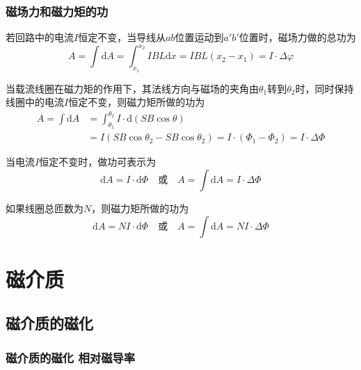\documentclass[
	12pt, %
	a4paper, %
]{myLegrandOrangeBook}
\newcommand{\rmd}{\mathrm{d}}
\begin{document}
\subsection{磁场力和磁力矩的功}

若回路中的电流\(I\)恒定不变，当导线从\(ab\)位置运动到\(a\prime b \prime\)位置时，磁场力做的总功为
\begin{equation}
    A = \int \rmd A = \int_{x_1}^{x_2} IBL \rmd x = IBL (x_2 - x_1) = I \cdot \Delta \varphi
\end{equation}

当载流线圈在磁力矩的作用下，其法线方向与磁场的夹角由\(\theta_1\)转到\(\theta_2\)时，同时保持线圈中的电流\(I\)恒定不变，则磁力矩所做的功为
\begin{equation}
    \begin{aligned}
        A = \int \rmd A & = \int_{\theta_1}^{\theta_2} I \cdot \rmd (SB \cos \theta) \\
        & = I (SB \cos \theta_2 - SB \cos \theta_2) = I \cdot (\Phi_1 - \Phi_2) = I \cdot \Delta \Phi
    \end{aligned}
\end{equation}

当电流\(I\)恒定不变时，做功可表示为
\begin{equation}
    \rmd A = I \cdot \rmd \Phi \quad \text{或} \quad A = \int \rmd A = I \cdot \Delta \Phi
\end{equation}

如果线圈总匝数为\(N\)，则磁力矩所做的功为
\begin{equation}
    \rmd A = NI \cdot \rmd \Phi \quad \text{或} \quad A = \int \rmd A = NI \cdot \Delta \Phi
\end{equation}

\chapterspaceabove{6.25cm} %
\chapterspacebelow{7.5cm} %

\chapter{磁介质}

\section{磁介质的磁化}

\subsection{磁介质的磁化 \quad 相对磁导率}
\end{document}
